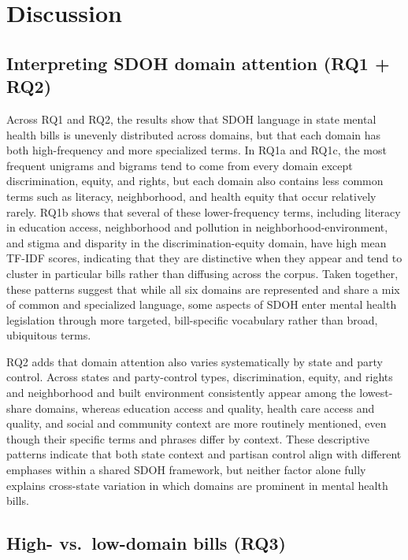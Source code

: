 \documentclass[10pt,twocolumn]{article}
\begin{document}
\section{Discussion}\label{discussion}

\subsection{Interpreting SDOH domain attention (RQ1 +
RQ2)}\label{interpreting-sdoh-domain-attention-rq1-rq2}

Across RQ1 and RQ2, the results show that SDOH language in state mental
health bills is unevenly distributed across domains, but that each
domain has both high-frequency and more specialized terms. In RQ1a and
RQ1c, the most frequent unigrams and bigrams tend to come from every
domain except discrimination, equity, and rights, but each domain also
contains less common terms such as literacy, neighborhood, and health
equity that occur relatively rarely. RQ1b shows that several of these
lower-frequency terms, including literacy in education access,
neighborhood and pollution in neighborhood-environment, and stigma and
disparity in the discrimination-equity domain, have high mean TF-IDF
scores, indicating that they are distinctive when they appear and tend
to cluster in particular bills rather than diffusing across the corpus.
Taken together, these patterns suggest that while all six domains are
represented and share a mix of common and specialized language, some
aspects of SDOH enter mental health legislation through more targeted,
bill-specific vocabulary rather than broad, ubiquitous terms.

RQ2 adds that domain attention also varies systematically by state and
party control. Across states and party-control types, discrimination,
equity, and rights and neighborhood and built environment consistently
appear among the lowest-share domains, whereas education access and
quality, health care access and quality, and social and community
context are more routinely mentioned, even though their specific terms
and phrases differ by context. These descriptive patterns indicate that
both state context and partisan control align with different emphases
within a shared SDOH framework, but neither factor alone fully explains
cross-state variation in which domains are prominent in mental health
bills.

\subsection{High- vs.~low-domain bills
(RQ3)}\label{high--vs.-low-domain-bills-rq3}
\end{document}
